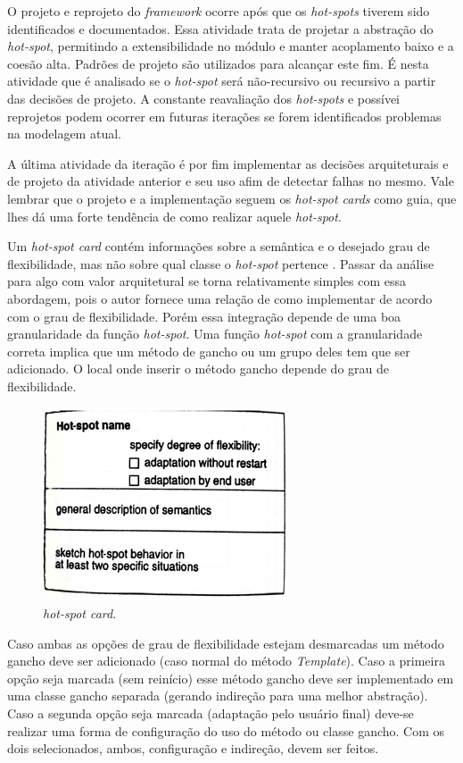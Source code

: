 O projeto e reprojeto do \textit{framework} ocorre após que os \textit{hot-spots} tiverem sido identificados e documentados. Essa atividade trata de projetar a abstração do \textit{hot-spot}, permitindo a extensibilidade no módulo e manter acoplamento baixo e a coesão alta. Padrões de projeto são utilizados para alcançar este fim. É nesta atividade que é analisado se o \textit{hot-spot} será não-recursivo ou recursivo a partir das decisões de projeto. A constante reavaliação dos \textit{hot-spots} e possívei reprojetos podem ocorrer em futuras iterações se forem identificados problemas na modelagem atual.

A última atividade da iteração é por fim implementar as decisões arquiteturais e de projeto da atividade anterior e seu uso afim de detectar falhas no mesmo. Vale lembrar que o projeto e a implementação seguem os \textit{hot-spot cards} como guia, que lhes dá uma forte tendência de como realizar aquele \textit{hot-spot}.

Um \textit{hot-spot card} contém informações sobre a semântica e o desejado grau de flexibilidade, mas não sobre qual classe o \textit{hot-spot} pertence \cite{Fayad1999}. Passar da análise para algo com valor arquitetural se torna relativamente simples com essa abordagem, pois o autor fornece uma relação de como implementar de acordo com o grau de flexibilidade. Porém essa integração depende de uma boa granularidade da função \textit{hot-spot}. Uma função \textit{hot-spot} com a granularidade correta implica que um método de gancho ou um grupo deles tem que ser adicionado. O local onde inserir o método gancho depende do grau de flexibilidade.

\begin{figure}[h]
	\centering
	\label{fig16}
		\includegraphics[keepaspectratio=true,scale=0.4]{figuras/hotspotcard.jpg}
	\caption{\textit{hot-spot card}. \cite{Fayad1999}}
\end{figure}

Caso ambas as opções de grau de flexibilidade estejam desmarcadas um método gancho deve ser adicionado (caso normal do método \textit{Template}). Caso a primeira opção seja marcada (sem reinício) esse método gancho deve ser implementado em uma classe gancho separada (gerando indireção para uma melhor abstração). Caso a segunda opção seja marcada (adaptação pelo usuário final) deve-se realizar uma forma de configuração do uso do método ou classe gancho. Com os dois selecionados, ambos, configuração e indireção, devem ser feitos.

